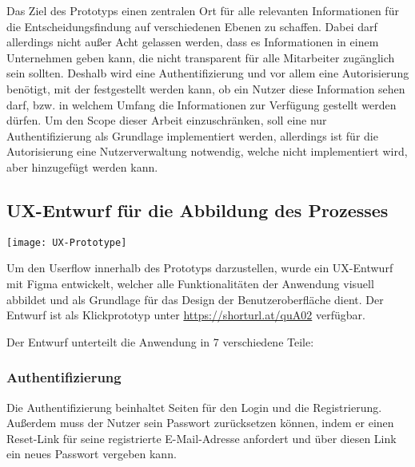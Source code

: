 Das Ziel des Prototyps einen zentralen Ort für alle relevanten Informationen für die Entscheidungsfindung auf verschiedenen Ebenen zu schaffen. Dabei darf allerdings nicht außer Acht gelassen werden, dass es Informationen in einem Unternehmen geben kann, die nicht transparent für alle Mitarbeiter zugänglich sein sollten. Deshalb wird eine Authentifizierung und vor allem eine Autorisierung benötigt, mit der festgestellt werden kann, ob ein Nutzer diese Information sehen darf, bzw. in welchem Umfang die Informationen zur Verfügung gestellt werden dürfen. Um den Scope dieser Arbeit einzuschränken, soll eine nur Authentifizierung als Grundlage implementiert werden, allerdings ist für die Autorisierung eine Nutzerverwaltung notwendig, welche nicht implementiert wird, aber hinzugefügt werden kann.

\subsection{UX-Entwurf für die Abbildung des Prozesses}
\vspace{20pt}
\begin{center}
    \begin{minipage}{\linewidth}
        \texttt{[image: UX-Prototype]}
    \end{minipage}
\end{center}
\vspace{20pt}

Um den Userflow innerhalb des Prototyps darzustellen, wurde ein UX-Entwurf mit Figma entwickelt, welcher alle Funktionalitäten der Anwendung visuell abbildet und als Grundlage für das Design der Benutzeroberfläche dient. Der Entwurf ist als Klickprototyp unter \href{https://www.figma.com/proto/6TjaUCKvs4DjwzTDEiWxiO/Prototype?type=design&node-id=0-1&scaling=min-zoom&starting-point-node-id=2%3A61}{https://shorturl.at/quA02} verfügbar.

Der Entwurf unterteilt die Anwendung in 7 verschiedene Teile:

\subsubsection{Authentifizierung}
Die Authentifizierung beinhaltet Seiten für den Login und die Registrierung. Außerdem muss der Nutzer sein Passwort zurücksetzen können, indem er einen Reset-Link für seine registrierte E-Mail-Adresse anfordert und über diesen Link ein neues Passwort vergeben kann.

